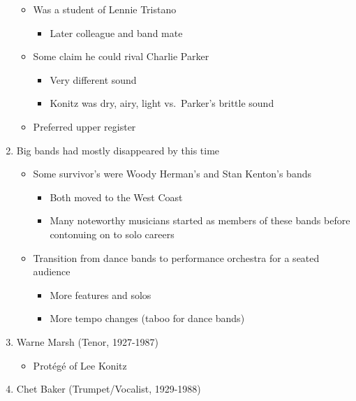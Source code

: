 \documentclass[]{article}
\providecommand{\tightlist}{%
  \setlength{\itemsep}{0pt}\setlength{\parskip}{0pt}}
\begin{document}
\begin{enumerate}
  \begin{itemize}
  \tightlist
  \item
    Was a student of Lennie Tristano

    \begin{itemize}
    \tightlist
    \item
      Later colleague and band mate
    \end{itemize}
  \item
    Some claim he could rival Charlie Parker

    \begin{itemize}
    \tightlist
    \item
      Very different sound
    \item
      Konitz was dry, airy, light vs.~Parker's brittle sound
    \end{itemize}
  \item
    Preferred upper register
  \end{itemize}
\item
  Big bands had mostly disappeared by this time

  \begin{itemize}
  \tightlist
  \item
    Some survivor's were Woody Herman's and Stan Kenton's bands

    \begin{itemize}
    \tightlist
    \item
      Both moved to the West Coast
    \item
      Many noteworthy musicians started as members of these bands before
      contonuing on to solo careers
    \end{itemize}
  \item
    Transition from dance bands to performance orchestra for a seated
    audience

    \begin{itemize}
    \tightlist
    \item
      More features and solos
    \item
      More tempo changes (taboo for dance bands)
    \end{itemize}
  \end{itemize}
\item
  Warne Marsh (Tenor, 1927-1987)

  \begin{itemize}
  \tightlist
  \item
    Protégé of Lee Konitz
  \end{itemize}
\item
  Chet Baker (Trumpet/Vocalist, 1929-1988)


\end{enumerate}
\end{document}
